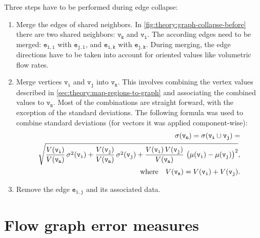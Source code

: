 Three steps have to be performed during edge collapse:
%
%
\begin{enumerate}
	\item Merge the edges of shared neighbors. In \autoref{fig:theory:graph-collapse-before} there are two shared neighbors: $\mathtt{v_k}$ and $\mathtt{v_l}$. The according edges need to be merged: $\mathtt{e_{l,i}}$ with $\mathtt{e_{j,l}}$, and $\mathtt{e_{i,k}}$ with $\mathtt{e_{j,k}}$. During merging, the edge directions have to be taken into account for oriented values like volumetric flow rates.%
%
	\item Merge vertices $\mathtt{v_i}$ and $\mathtt{v_j}$ into $\mathtt{v_n}$. This involves combining the vertex values described in \autoref{sec:theory:map-regions-to-graph} and associating the combined values to $\mathtt{v_n}$. Most of the combinations are straight forward, with the exception of the standard deviations. The following formula was used to combine standard deviations (for vectors it was applied component-wise):
%
\begin{equation}
\begin{split}
\sigma(\mathtt{v_n}) = \sigma(\mathtt{v_i}\cup\mathtt{v_j}) =\\
\sqrt{
	\normprod{
		\frac{
			V(\mathtt{v_i})
		}{
 			V(\mathtt{v_n})
 		}
 	}{
		\sigma^2(\mathtt{v_i})
	}
 	+
 	\normprod{
		\frac{
 	  	V(\mathtt{v_j})		
 	  }{
 			V(\mathtt{v_n})
 		}
 	}{
 	  \sigma^2(\mathtt{v_j})
 	}
 	+
 	\normprod{
	 	\frac{
			\normprod{
				V(\mathtt{v_i})
			}{
				V(\mathtt{v_j})
			}
	 	}{
	 		V(\mathtt{v_n})
	 	}
	}{
		\left(
			\mu(\mathtt{v_i}) - \mu(\mathtt{v_j})
		\right)^2
	}
},\\
\quad\text{where}\quad V(\mathtt{v_n}) = V(\mathtt{v_i}) + V(\mathtt{v_j}).
\end{split}
\end{equation}
%
	\item Remove the edge $\mathtt{e_{i,j}}$ and its associated data.
\end{enumerate}

\section{Flow graph error measures}
\label{sec:theory:graph-error-measures}

